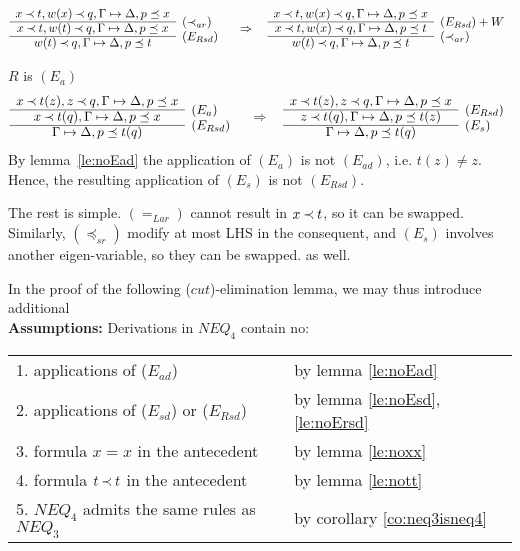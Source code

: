 \begin{PROOF}
\begin{LS}
\[\begin{array}{cl}
x\Incl t, w(x)\Incl q,\GSD, p\preceq x  & \\ \cline{1-1}
x\Incl t, w(t)\Incl q,\GSD,p\preceq x & \raisebox{1.2ex}[1.5ex][0ex]{($\Incl_{ar}$)} \\ \cline{1-1}
w(t)\Incl q, \GSD,p\preceq t  &  \raisebox{1.2ex}[1.5ex][0ex]{($E_{Rsd}$)}
\end{array} 
\conv 
\begin{array}{cl}
x\Incl t, w(x)\Incl q,\GSD, p\preceq x  & \\ \cline{1-1}
x\Incl t, w(x)\Incl q,\GSD,p\preceq t & \raisebox{1.2ex}[1.5ex][0ex]{$(E_{Rsd})+W$} \\ \cline{1-1}
w(t)\Incl q, \GSD,p\preceq t  &  \raisebox{1.2ex}[1.5ex][0ex]{($\Incl_{ar}$)}
\end{array}
\]
\item $R$ is $(E_a)$ 
\[ \begin{array}{cl}
x\Incl t(z), z\Incl q,\GSD, p\preceq x  & \\ \cline{1-1}
x\Incl t(q), \GSD,p\preceq x & \raisebox{1.2ex}[1.5ex][0ex]{($E_{a}$)} \\ \cline{1-1}
 \GSD,p\preceq t(q)  &  \raisebox{1.2ex}[1.5ex][0ex]{($E_{Rsd}$)}
\end{array} 
\conv 
\begin{array}{cl}
x\Incl t(z), z\Incl q,\GSD, p\preceq x  & \\ \cline{1-1}
z\Incl t(q), \GSD,p\preceq t(z) & \raisebox{1.2ex}[1.5ex][0ex]{($E_{Rsd}$)} \\ \cline{1-1}
 \GSD,p\preceq t(q) & \raisebox{1.2ex}[1.5ex][0ex]{($E_{s}$)} 
\end{array}
\]
By lemma~\ref{le:noEad} the application of $(E_a)$ is not $(E_{ad})$, i.e. $t(z)\not=z$.
Hence, the resulting application of $(E_s)$ is not $(E_{Rsd})$.
\end{LS}
The rest is simple. $(=_{Lar})$ cannot result in $x\mathbin{\prec} t$, so it can be swapped.
Similarly, $(\preceq_{sr})$ modify at most LHS in the consequent, and $(E_s)$ involves 
another eigen-variable, so they can be swapped.
as well.
\end{PROOF}

In the proof of the following ($cut$)-elimination lemma, 
we may thus introduce additional
\\[1ex]
\noindent
{\bf Assumptions:} Derivations in $NEQ_4$ contain no:

\begin{tabular}{ll}
1. applications of ($E_{ad}$) & by lemma \ref{le:noEad} \\
2. applications of ($E_{sd}$) or ($E_{Rsd}$) & by lemma \ref{le:noEsd}, \ref{le:noErsd} \\
3. formula $x=x$ in the antecedent & by lemma \ref{le:noxx} \\
4. formula $t\mathbin{\prec} t$ in the antecedent & by lemma \ref{le:nott} \\
5. $NEQ_4$ admits the same rules as $NEQ_3$ & by corollary \ref{co:neq3isneq4}
\end{tabular} 

